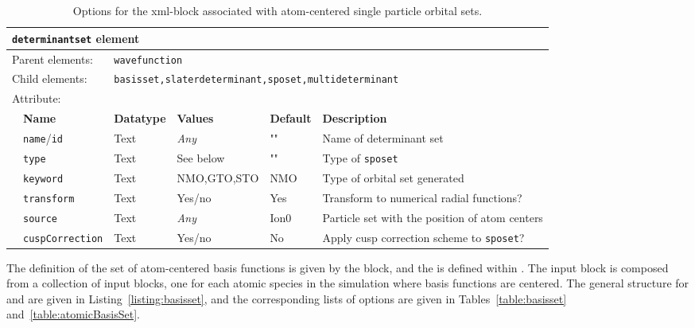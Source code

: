 \begin{table}[h]
\begin{center}
\begin{tabularx}{\textwidth}{l l l l l X }
\hline
\multicolumn{6}{l}{\texttt{determinantset} element} \\
\hline
\multicolumn{2}{l}{Parent elements:} & \multicolumn{4}{l}{\texttt{wavefunction}}\\
\multicolumn{2}{l}{Child  elements:} & \multicolumn{4}{l}{\texttt{basisset,slaterdeterminant,sposet,multideterminant}}\\
\multicolumn{2}{l}{Attribute:} & \multicolumn{4}{l}{}\\
   &   \bfseries Name              & \bfseries Datatype & \bfseries Values & \bfseries Default   & \bfseries Description \\
   &   \texttt{name}/\texttt{id}   &  Text              &  \textit{Any}    &  ""             & Name of determinant set \\
   &   \texttt{type}                    &  Text               &   See below   &   ""            &  Type of \texttt{sposet} \\
   &   \texttt{keyword}             &  Text               &   NMO,GTO,STO   &  NMO        & Type of orbital set generated \\  
   &   \texttt{transform}           &  Text               &   Yes/no          &  Yes         &  Transform to numerical radial functions?  \\
   &   \texttt{source}               &  Text               &   \textit{Any}    &  Ion0        & Particle set with the position of atom centers \\
   &   \texttt{cuspCorrection}  &  Text               &   Yes/no          &  No         & Apply cusp correction scheme to \texttt{sposet}? \\
  \hline
\end{tabularx}
\end{center}
\caption{Options for the  xml-block associated with atom-centered single particle orbital sets.}
\label{table:determinantset}
\end{table}

The definition of the set of atom-centered basis functions is given by the  block, and the  is defined within . The  input block is composed from a collection of  input blocks, one for each atomic species in the simulation where basis functions are centered. The general structure for  and  are given in Listing~\ref{listing:basisset}, and the corresponding lists of options are given in Tables~\ref{table:basisset} and~\ref{table:atomicBasisSet}.

